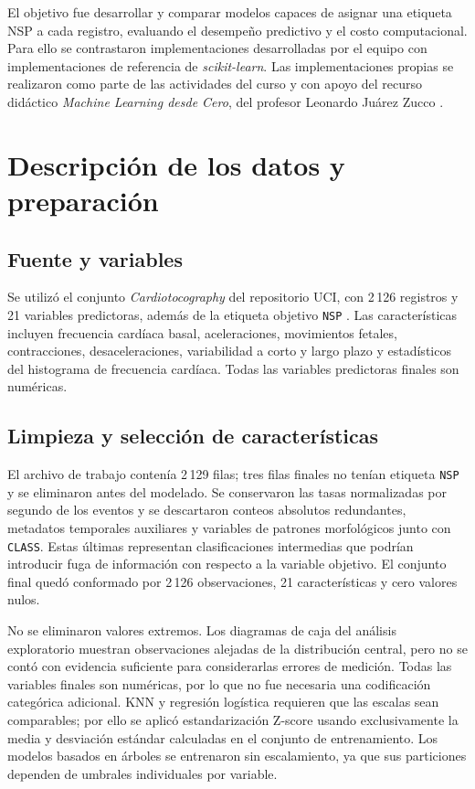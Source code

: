 El objetivo fue desarrollar y comparar modelos capaces de asignar una etiqueta NSP a cada registro, evaluando el desempe\~no predictivo y el costo computacional. Para ello se contrastaron implementaciones desarrolladas por el equipo con implementaciones de referencia de \textit{scikit-learn}. Las implementaciones propias se realizaron como parte de las actividades del curso y con apoyo del recurso did\'actico \textit{Machine Learning desde Cero}, del profesor Leonardo Ju\'arez Zucco \parencite{zucco_ml}.

\section{Descripci\'on de los datos y preparaci\'on}
\subsection{Fuente y variables}
Se utiliz\'o el conjunto \textit{Cardiotocography} del repositorio UCI, con 2\,126 registros y 21 variables predictoras, adem\'as de la etiqueta objetivo \texttt{NSP} \parencite{uci_ctg}. Las caracter\'isticas incluyen frecuencia card\'iaca basal, aceleraciones, movimientos fetales, contracciones, desaceleraciones, variabilidad a corto y largo plazo y estad\'isticos del histograma de frecuencia card\'iaca. Todas las variables predictoras finales son num\'ericas.

\subsection{Limpieza y selecci\'on de caracter\'isticas}
El archivo de trabajo conten\'ia 2\,129 filas; tres filas finales no ten\'ian etiqueta \texttt{NSP} y se eliminaron antes del modelado. Se conservaron las tasas normalizadas por segundo de los eventos y se descartaron conteos absolutos redundantes, metadatos temporales auxiliares y variables de patrones morfol\'ogicos junto con \texttt{CLASS}. Estas \'ultimas representan clasificaciones intermedias que podr\'ian introducir fuga de informaci\'on con respecto a la variable objetivo. El conjunto final qued\'o conformado por 2\,126 observaciones, 21 caracter\'isticas y cero valores nulos.

No se eliminaron valores extremos. Los diagramas de caja del an\'alisis exploratorio muestran observaciones alejadas de la distribuci\'on central, pero no se cont\'o con evidencia suficiente para considerarlas errores de medici\'on. Todas las variables finales son num\'ericas, por lo que no fue necesaria una codificaci\'on categ\'orica adicional. KNN y regresi\'on log\'istica requieren que las escalas sean comparables; por ello se aplic\'o estandarizaci\'on Z-score usando exclusivamente la media y desviaci\'on est\'andar calculadas en el conjunto de entrenamiento. Los modelos basados en \'arboles se entrenaron sin escalamiento, ya que sus particiones dependen de umbrales individuales por variable.

